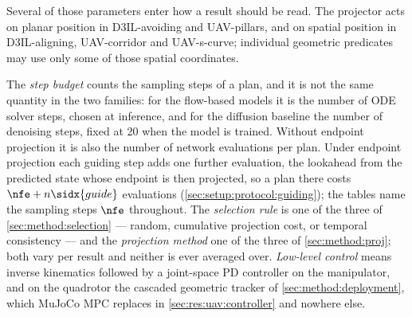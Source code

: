 
Several of those parameters enter how a result should be read. The projector acts on planar position in
D3IL-avoiding and UAV-pillars, and on spatial position in D3IL-aligning, UAV-corridor and UAV-s-curve;
individual geometric predicates may use only some of those spatial coordinates.

The \emph{step budget} counts the sampling steps of a plan, and it is not the same quantity in the two
families: for the flow-based models it is the number of ODE solver steps, chosen at inference, and for
the diffusion baseline the number of denoising steps, fixed at 20 when the model is trained. Without
endpoint projection it is also the number of network evaluations per plan. Under endpoint projection each
guiding step adds one further evaluation, the lookahead from the predicted state whose endpoint is then
projected, so a plan there costs
$\nfe + n\sidx{guide}$ evaluations (\autoref{sec:setup:protocol:guiding}); the tables name the sampling
steps $\nfe$ throughout.
The \emph{selection rule} is one of the three of \autoref{sec:method:selection} --- random, cumulative
projection cost, or temporal consistency --- and the \emph{projection method} one of the three of
\autoref{sec:method:proj}; both vary per result and neither is ever averaged over. \emph{Low-level
control} means inverse kinematics followed by a joint-space PD controller on the manipulator, and on the
quadrotor the cascaded geometric tracker of \autoref{sec:method:deployment}, which MuJoCo MPC replaces in
\autoref{sec:res:uav:controller} and nowhere else.

